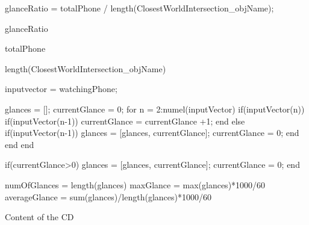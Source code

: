 glanceRatio = totalPhone / length(ClosestWorldIntersection_objName);

glanceRatio

totalPhone

length(ClosestWorldIntersection_objName)

inputvector = watchingPhone;

glances = [];
currentGlance = 0;
for n = 2:numel(inputVector)
    if(inputVector(n))
        if(inputVector(n-1))
            currentGlance = currentGlance +1;
        end
    else
        if(inputVector(n-1))
            glances = [glances, currentGlance];
            currentGlance = 0;
        end
    end
end


if(currentGlance>0)
    glances = [glances, currentGlance];
    currentGlance = 0;
end

numOfGlances = length(glances)
maxGlance = max(glances)*1000/60
averageGlance = sum(glances)/length(glances)*1000/60
\endtt

\nextoddpage

\app Content of the CD


